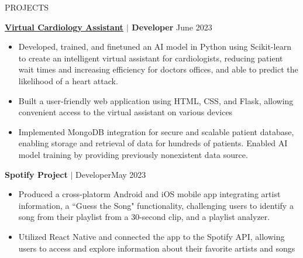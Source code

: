\documentclass{resume} %
\begin{document}


\vspace{-0.4em}
\begin{rSection}{PROJECTS}

{\textbf{\href{https://github.com/eden-chung/CardiologistAssistant}{\underline{Virtual Cardiology Assistant}} $\vert$ Developer}} \hfill June 2023 \\
\vspace{-1.5em}
\begin{itemize}
\item Developed, trained, and finetuned an AI model in Python using Scikit-learn to create an intelligent virtual assistant for cardiologists, reducing patient wait times and increasing efficiency for doctors offices, and able to predict the likelihood of a heart attack.
\vspace{-0.4em}
\item Built a user-friendly web application using HTML, CSS, and Flask, allowing convenient access to the virtual assistant on various devices
\vspace{-0.4em}
\item Implemented MongoDB integration for secure and scalable patient database, enabling storage and retrieval of data for hundreds of patients. Enabled AI model training by providing previously nonexistent data source.
\end{itemize}

\vspace{-0.25em}

{\textbf{Spotify Project} $\vert$ Developer}\hfill May 2023 \\
\vspace{-1.5em}
\begin{itemize}
\item Produced a cross-platorm Android and iOS mobile app integrating artist information, a ``Guess the Song" functionality, challenging users to identify a song from their playlist from a 30-second clip, and a playlist analyzer.
\vspace{-0.4em}
\item Utilized React Native and connected the app to the Spotify API, allowing users to access and explore information about their favorite artists and songs
\end{itemize}
\vspace{-0.25em}



\end{rSection}
\end{document}
